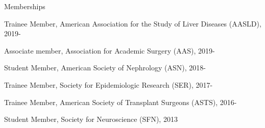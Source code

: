 \documentclass[10pt]{article}
\renewcommand{\section}[1]{\pagebreak[3]%
    \vspace{1.3\baselineskip}%
    \phantomsection\addcontentsline{toc}{section}{#1}%
    \noindent\llap{\scshape\smash{\parbox[t]{\marginparwidth}{\hyphenpenalty=10000\raggedright #1}}}%
    \vspace{-\baselineskip}\par}
\begin{document}
\vspace{2mm}

Memberships

\begin{innerlist}

\item Trainee Member, American Association for the Study of
  Liver Diseases (AASLD), 2019-
\item Associate member, Association for Academic Surgery (AAS), 2019-
\item Student Member, American Society of Nephrology (ASN), 2018-
\item Trainee Member, Society for Epidemiologic Research (SER), 2017-
\item Trainee Member, American Society of Transplant Surgeons (ASTS), 2016-
\item Student Member, Society for Neuroscience (SFN), 2013

\end{innerlist}

\end{document}
